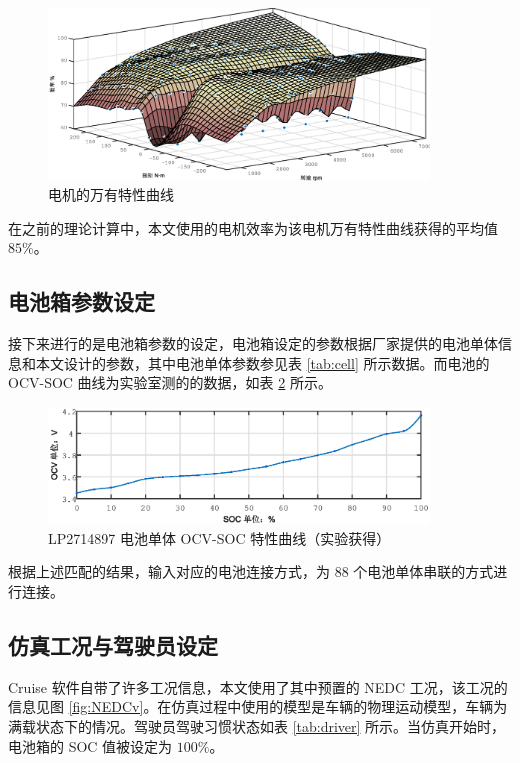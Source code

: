 \begin{figure}
	\centering
	\includegraphics[width=0.9\textwidth]{figures/asm_characteristics_cruise.eps}
	\caption{电机的万有特性曲线}\label{fig:asm_characteristics}
\end{figure}

在之前的理论计算中，本文使用的电机效率为该电机万有特性曲线获得的平均值 $85\%$。

\subsection{电池箱参数设定}
接下来进行的是电池箱参数的设定，电池箱设定的参数根据厂家提供的电池单体信息和本文设计的参数，其中电池单体参数参见表 \ref{tab:cell} 所示数据。而电池的 OCV-SOC 曲线为实验室测的的数据，如表 \ref{fig:cell-OCV} 所示。

\begin{figure}
	\centering
	\includegraphics[width=0.9\textwidth]{figures/cell-OCV.eps}
	\caption{LP2714897 电池单体 OCV-SOC 特性曲线（实验获得）}\label{fig:cell-OCV}
\end{figure}

根据上述匹配的结果，输入对应的电池连接方式，为 88 个电池单体串联的方式进行连接。

\subsection{仿真工况与驾驶员设定}
Cruise 软件自带了许多工况信息，本文使用了其中预置的 NEDC 工况，该工况的信息见图 \ref{fig:NEDCv}。在仿真过程中使用的模型是车辆的物理运动模型，车辆为满载状态下的情况。驾驶员驾驶习惯状态如表 \ref{tab:driver} 所示。当仿真开始时，电池箱的 SOC 值被设定为 $100\%$。

